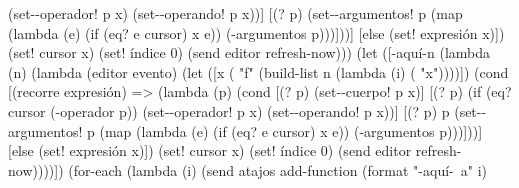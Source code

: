 \documentclass[letterpaper, twoside, openright, 11pt]{book}%
\begin{document}
{{                                      (set--operador! p x)
                                      (set--operando! p x))]
                                 [(? p)
                                  (set--argumentos! p
                                   (map (lambda (e)
                                          (if (eq? e cursor) x e))
                                        (-argumentos p)))]))]
                     [else
                      (set! expresión x)])
               (set! cursor x)
               (set! índice 0)
               (send editor refresh-now)))
      (let ([-aquí-n
             (lambda (n)
               (lambda (editor evento)
                 (let ([x ( "f" (build-list n (lambda (i)
                                                               ( "x"))))])
                   (cond [(recorre expresión)
                          => (lambda (p)
                               (cond [(? p)
                                      (set--cuerpo! p x)]
                                     [(? p)
                                      (if (eq? cursor (-operador p))
                                          (set--operador! p x)
                                          (set--operando! p x))]
                                     [(? p) p
                                      (set--argumentos! p
                                       (map (lambda (e)
                                              (if (eq? e cursor) x e))
                                            (-argumentos p)))]))]
                         [else
                          (set! expresión x)])
                   (set! cursor x)
                   (set! índice 0)
                   (send editor refresh-now))))])
        (for-each (lambda (i)
                    (send atajos add-function (format "-aquí-~a" i)
}}
\end{document}
